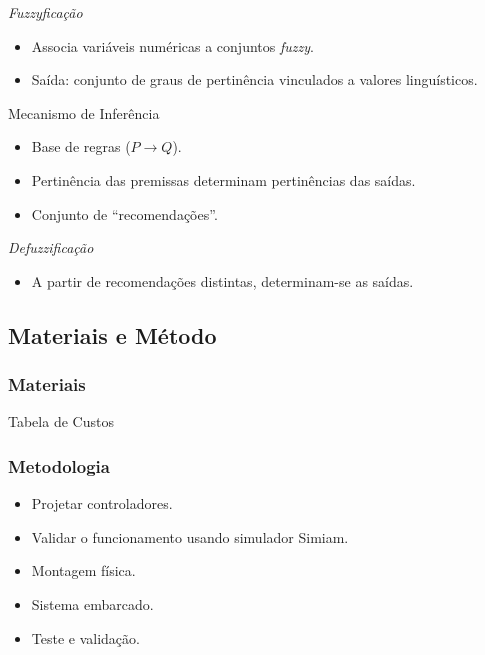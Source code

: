 \documentclass[hyperref={pdfpagelabels=false},table]{beamer}
\begin{document}
\begin{frame}
	\begin{block}{\textit{Fuzzyficação}}
		\begin{itemize}
		  \item Associa variáveis numéricas a conjuntos \textit{fuzzy}.
		  \item Saída: conjunto de graus de pertinência vinculados a valores
		  linguísticos.
		\end{itemize}
	\end{block}
	\pause
	\begin{exampleblock}{Mecanismo de Inferência}
		\begin{itemize}
		  \item Base de regras ($P \rightarrow Q$).
		  \item Pertinência das premissas determinam pertinências das saídas.
		  \item Conjunto de ``recomendações''.
		\end{itemize}
	\end{exampleblock}
	\pause
	\begin{block}{\textit{Defuzzificação}}
		\begin{itemize}
		  \item A partir de recomendações distintas, determinam-se as saídas.
		\end{itemize}
	\end{block}
\end{frame}

\subsection{Materiais e Método}
\begin{frame}
	\frametitle{Materiais}
	\begin{block}{Tabela de Custos}
		
	\end{block}
\end{frame}

\begin{frame}
	\frametitle{Metodologia}
	\begin{block}{}
		\begin{itemize}
		  \item Projetar controladores.
		  \item Validar o funcionamento usando simulador Simiam.
		  \item Montagem física.
		  \item Sistema embarcado.
		  \item Teste e validação.
		\end{itemize}
	\end{block}
\end{frame}
\end{document}
